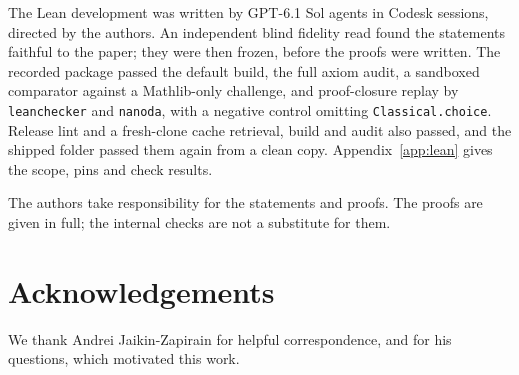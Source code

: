 The Lean development was written by GPT-6.1 Sol agents in Codesk
sessions, directed by the authors. An independent blind fidelity read
found the statements faithful to the paper; they were then frozen,
before the proofs were written. The recorded package passed the default
build, the full axiom audit, a sandboxed comparator against a
Mathlib-only challenge, and proof-closure replay by \texttt{leanchecker}
and \texttt{nanoda}, with a negative control omitting
\texttt{Classical.choice}. Release lint and a fresh-clone cache retrieval,
build and audit also passed, and the shipped folder passed them again
from a clean copy. Appendix~\ref{app:lean} gives the scope, pins and
check results.

The authors take responsibility for
the statements and proofs. The proofs are given in full; the internal
checks are not a substitute for them.

\section*{Acknowledgements}
We thank Andrei Jaikin-Zapirain for helpful correspondence, and for his
questions, which motivated this work.
